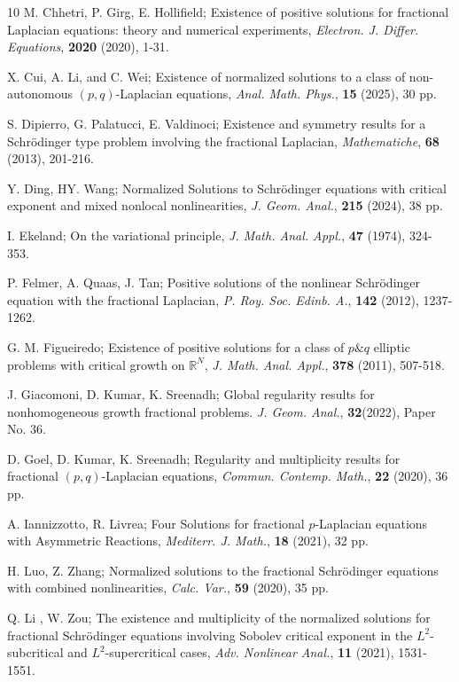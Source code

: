 \documentclass[reqno]{amsart}
\begin{document}
\begin{thebibliography}{10}
M. Chhetri, P. Girg, E. Hollifield;
Existence of positive solutions for fractional Laplacian equations: 
theory and numerical experiments,
\emph{Electron. J. Differ. Equations},
\textbf{2020} (2020), 1-31.

 X. Cui, A. Li, and C. Wei;
 Existence of normalized solutions to a class of non-autonomous
$(p, q)$-Laplacian equations, \emph{Anal. Math. Phys.}, \textbf{15} (2025), 30 pp.


S. Dipierro, G. Palatucci, E. Valdinoci;
Existence and symmetry results for a Schr\"{o}dinger type problem involving the 
fractional Laplacian, \emph{Mathematiche}, \textbf{68} (2013), 201-216.

Y. Ding, HY. Wang;
Normalized Solutions to Schr\"{o}dinger equations with critical exponent and mixed 
nonlocal nonlinearities,
\emph{ J. Geom. Anal.}, \textbf{215} (2024), 38 pp.


I. Ekeland;
On the variational principle,
\emph{J. Math. Anal. Appl.}, \textbf{47} (1974), 324-353.

P. Felmer, A. Quaas, J. Tan;
Positive solutions of the nonlinear Schr\"{o}dinger
equation with the fractional Laplacian,
\emph{P. Roy. Soc. Edinb. A.}, \textbf{142} (2012), 1237-1262.

G. M. Figueiredo;
Existence of positive solutions for a class of $p\&q$ elliptic problems with 
critical growth on $\mathbb{R}^N$,
\emph{J. Math. Anal. Appl.}, \textbf{378} (2011), 507-518.


J. Giacomoni, D. Kumar,  K. Sreenadh;
 Global regularity results for nonhomogeneous growth fractional problems. 
 \emph{J. Geom. Anal.}, \textbf{32}(2022), Paper No. 36.

D. Goel, D. Kumar, K. Sreenadh;
Regularity and multiplicity results for fractional
$(p, q)$-Laplacian equations,
\emph{Commun. Contemp. Math.}, \textbf{22} (2020), 36 pp.

A. Iannizzotto, R. Livrea;
Four Solutions for fractional $p$-Laplacian
equations with Asymmetric Reactions,
\emph{Mediterr. J. Math.}, \textbf{18} (2021), 32 pp.

H. Luo, Z. Zhang;
Normalized solutions to the fractional Schr\"{o}dinger equations with combined
 nonlinearities, \emph{Calc. Var.},
\textbf{59} (2020), 35 pp.

Q. Li , W. Zou;
The existence and multiplicity of the
normalized solutions for fractional
Schr\"{o}dinger equations involving Sobolev
critical exponent in the $L^2$-subcritical and
$L^2$-supercritical cases,
\emph{Adv. Nonlinear Anal.}, \textbf{11} (2021), 1531-1551.


\end{thebibliography}
\end{document}
